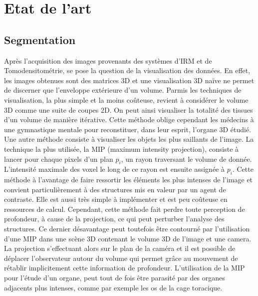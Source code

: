 
%
\chapter{Etat de l'art}



\section{Segmentation}
\label{sec:EA:segmentation}


Après l'acquisition des images provenants des systèmes d'IRM et de Tomodensitométrie, se pose la question de la visualisation des données. En effet, les images obtenues sont des matrices 3D et une visualisation 3D naïve ne permet de discerner que l'enveloppe extérieure d'un volume. Parmis les techniques de visualisation, la plus simple et la moins coûteuse, revient à considérer le volume 3D comme une suite de coupes 2D. On peut ainsi visualiser la totalité des tissues d'un volume de manière itérative. Cette méthode oblige cependant les médecins à une gymnastique mentale pour reconstituer, dans leur esprit, l'organe 3D étudié. Une autre méthode consiste à visualiser les objets les plus saillants de l'image. La technique la plus utilisée, la MIP (maximum intensity projection), consiste à lancer pour chaque pixels d'un plan $p_i$, un rayon traversant le volume de donnée. L'intensité maximale des voxel le long de ce rayon est ensuite assignée à $p_i$. Cette méthode à l'avantage de faire ressortir les éléments les plus intenses de l'image et convient particulièrement à des structures mis en valeur par un agent de contraste. Elle est aussi très simple à implémenter et est peu coûteuse en ressources de calcul. Cependant, cette méthode fait perdre toute perception de profondeur, à cause de la projection, ce qui peut perturber l'analyse des structures. Ce dernier désavantage peut toutefois être contourné par l'utilisation d'une MIP dans une scène 3D contenant le volume 3D de l'image et une camera. La projection s'effectuant alors sur le plan de la caméra et il est possible de déplacer l'observateur autour du volume qui permet grâce au mouvement de rétablir implicitement cette information de profondeur. L'utilisation de la MIP pour l'étude d'un organe, peut tout de fois être parasité par des organes adjacents plus intenses, comme par exemple les os de la cage toracique.

